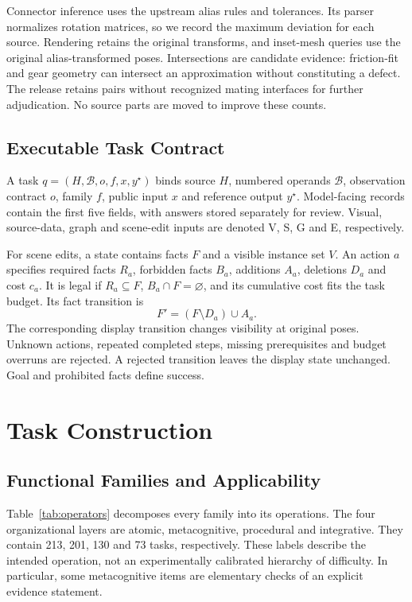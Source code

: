 \documentclass[10pt,twocolumn,letterpaper]{article}
\begin{document}
Connector inference uses the upstream alias rules and tolerances.
Its parser normalizes rotation matrices, so we record the maximum
deviation for each source. Rendering retains the original transforms,
and inset-mesh queries use the original alias-transformed poses.
Intersections are candidate evidence: friction-fit and gear geometry
can intersect an approximation without constituting a defect.
The release retains \LDrawIntersections{} pairs without recognized
mating interfaces for further adjudication. No source parts are moved
to improve these counts.

\subsection{Executable Task Contract}
A task $q=(H,\mathcal{B},o,f,x,y^\star)$ binds source $H$, numbered
operands $\mathcal{B}$, observation contract $o$, family $f$, public
input $x$ and reference output $y^\star$. Model-facing records contain
the first five fields, with answers stored separately for review.
Visual, source-data, graph and scene-edit inputs are denoted V, S, G
and E, respectively.

For scene edits, a state contains facts $F$ and a visible instance set
$V$. An action $a$ specifies required facts $R_a$, forbidden facts
$B_a$, additions $A_a$, deletions $D_a$ and cost $c_a$. It is legal if
$R_a\subseteq F$, $B_a\cap F=\varnothing$, and its cumulative cost
fits the task budget. Its fact transition is
\begin{equation}
F'=(F\setminus D_a)\cup A_a.
\end{equation}
The corresponding display transition changes visibility at original
poses. Unknown actions, repeated completed steps, missing prerequisites
and budget overruns are rejected. A rejected transition leaves the
display state unchanged. Goal and prohibited facts define success.

\section{Task Construction}
\subsection{Functional Families and Applicability}
Table~\ref{tab:operators} decomposes every family into its operations.
The four organizational layers are atomic, metacognitive, procedural
and integrative. They contain 213, 201, 130 and 73 tasks, respectively.
These labels describe the intended operation, not an experimentally
calibrated hierarchy of difficulty. In particular, some metacognitive
items are elementary checks of an explicit evidence statement.
\end{document}
